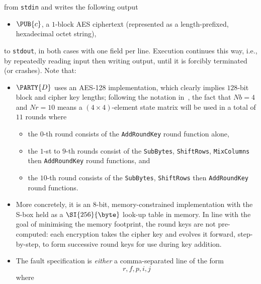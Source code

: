 \documentclass[crop={false},multi={true},tikz={true}]{standalone}
\begin{document}
\noindent
from \lstinline[language={bash}]{stdin} and writes the following output

\begin{itemize}
\item $\PUB{c}$,
      a  ${1}$-block AES ciphertext
      (represented as a  length-prefixed, hexadecimal octet   string),
\end{itemize}

\noindent
to \lstinline[language={bash}]{stdout}, in both cases with one field per 
line.  Execution continues this way, i.e., by repeatedly reading input 
then writing output, until it is forcibly terminated (or crashes).  
Note that:

\begin{itemize}
\item $\PARTY{D}$ uses an AES-128 implementation,
      which clearly implies $128$-bit block and cipher key lengths;
      following the notation in~\cite[Figure 5]{SCALE:FIPS:197:01}, the 
      fact that $Nb=4$ and $Nr=10$ means a $(4 \times 4)$-element state 
      matrix will be used in a total of $11$ rounds
      where

      \begin{itemize}
      \item the  $0$-th           round  consists of the
            \lstinline{AddRoundKey}
            round function  alone,
      \item the  $1$-st to $9$-th rounds consist  of the
            \lstinline{SubBytes}, \lstinline{ShiftRows},  \lstinline{MixColumns} then  \lstinline{AddRoundKey}
            round functions,
            and
      \item the $10$-th           round  consists of the
            \lstinline{SubBytes}, \lstinline{ShiftRows}                          then  \lstinline{AddRoundKey}
            round functions.
      \end{itemize}

\item More concretely, it is an $8$-bit, memory-constrained implementation
      with the S-box held as a $\SI{256}{\byte}$ look-up table in memory. 
      In line with the goal of minimising the memory footprint, the round
      keys are not pre-computed: each encryption takes the cipher key and
      evolves it forward, step-by-step, to form successive round keys for
      use during key addition.  
\item The fault specification is {\em either} a comma-separated line of the
      form
      \[
      r, f, p, i, j
      \]
      where


\end{itemize}
\end{document}
